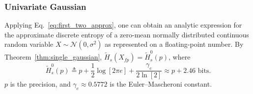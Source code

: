 \documentclass[12pt,onecolumn, margin=1in]{IEEEtran}
\newcommand{\Ht}{\tilde{H}}
\begin{document}
\subsubsection{Univariate Gaussian}
Applying Eq.~\eqref{eq:first_two_approx}, one can obtain an analytic expression for the approximate discrete entropy of a zero-mean normally distributed continuous random variable $X \sim \mathcal{N}(0, \sigma^2)$ as represented on a floating-point number. By Theorem~\ref{thm:single_gaussian}, $\Ht_s(X_{fp}) = \tilde H^0_s(p)$, where
\begin{equation}
    \label{eq:single_mean_0}
    \Ht^0_{s}(p) \triangleq p + \frac{1}{2} \log[2 \pi e] + \frac{\gamma_e}{2\ln[2]} \approx p + 2.46 \text{ bits}.
\end{equation}
$p$ is the precision, and $\gamma_e \approx 0.5772$ is the Euler--Mascheroni constant.
\end{document}
